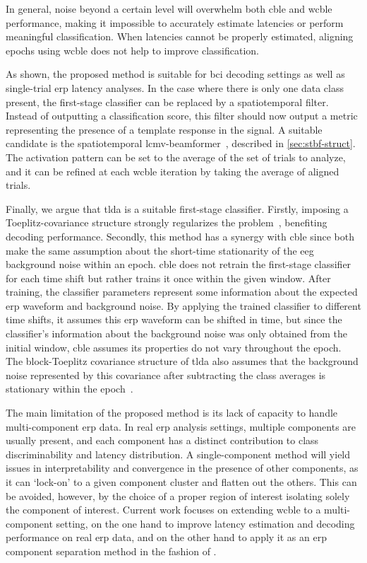 In general, noise beyond a certain level will overwhelm both \ac{cble} and
\ac{wcble} performance, making it impossible to accurately estimate latencies
or perform meaningful classification.
When latencies cannot be properly estimated, aligning epochs using \ac{wcble} does not help to improve classification.

As shown, the proposed method is suitable for \ac{bci} decoding settings
as well as single-trial \ac{erp} latency analyses.
In the case where there is only one data class present, the first-stage
classifier can be replaced by a spatiotemporal filter.
Instead of outputting a classification score, this filter should now output a
metric representing the presence of a template response in the signal.
A suitable candidate is the spatiotemporal
\ac{lcmv}-beamformer~\cite{VanVliet2015}, described in
\cref{sec:stbf-struct}.
The activation pattern can be set to the average of the set of trials to
analyze, and it can be refined at each \ac{wcble} iteration by taking the
average of aligned trials.

Finally, we argue that \ac{tlda} is a suitable first-stage classifier.
Firstly, imposing a Toeplitz-covariance structure strongly regularizes the
problem~\cite{Sosulski2022, VanDenKerchove2022}, benefiting decoding performance.
Secondly, this method has a synergy with \ac{cble} since both make the same
assumption about the short-time stationarity of the \ac{eeg} background noise
within an epoch.
\Ac{cble} does not retrain the first-stage classifier for each time shift but
rather trains it once within the given window.
After training, the classifier parameters represent some information about the
expected \ac{erp} waveform and background noise.
By applying the trained classifier to different time shifts, it assumes this
\ac{erp} waveform can be shifted in time, but since the classifier's information about
the background noise was only obtained from the initial window, \ac{cble} assumes
its properties do not vary throughout the epoch.
The block-Toeplitz covariance structure of \ac{tlda} also assumes that the
background noise represented by this covariance after subtracting the class
averages is stationary within the epoch~\cite{Sosulski2022}.

The main limitation of the proposed method is its lack of capacity to handle
multi-component \ac{erp} data.
In real \ac{erp} analysis settings, multiple components are usually present,
and each component has a distinct contribution to class discriminability and
latency distribution.
A single-component method will yield issues in interpretability and convergence
in the presence of other components, as it can `lock-on' to a given component
cluster and flatten out the others.
This can be avoided, however, by the choice of a proper region of interest
isolating solely the component of interest.
Current work focuses on extending \ac{wcble} to a multi-component setting, on
the one hand to improve latency estimation and decoding performance on real
\ac{erp} data, and on the other hand to apply it as an \ac{erp} component
separation method in the fashion of \textcite{Ouyang2017}.


